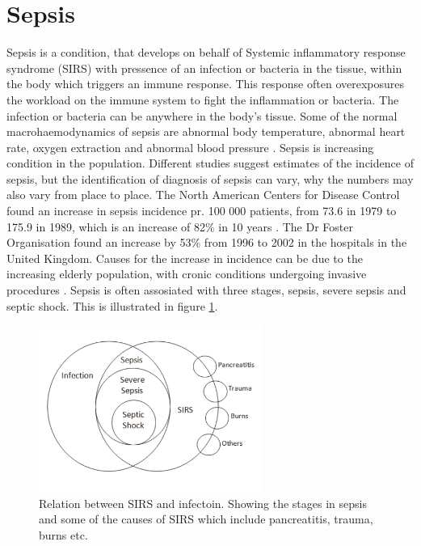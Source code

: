 \section{Sepsis}

Sepsis is a condition, that develops on behalf of Systemic inflammatory response syndrome (SIRS) with pressence of an infection or bacteria in the tissue, within the body which triggers an immune response. This response often overexposures the workload on the immune system to fight the inflammation or bacteria. The infection or bacteria can be anywhere in the body’s tissue. Some of the normal macrohaemodynamics of sepsis are abnormal body temperature, abnormal heart rate, oxygen extraction and abnormal blood pressure \cite{plunta2010,kanta2014}. Sepsis is increasing condition in the population. Different studies suggest estimates of the incidence of sepsis, but the identification of diagnosis of sepsis can vary, why the numbers may also vary from place to place. The North American Centers for Disease Control found an increase in sepsis incidence pr. 100 000 patients, from 73.6 in 1979 to 175.9 in 1989, which is an increase of 82\% in 10 years \cite{baudouin2008,kanta2014}. The Dr Foster Organisation found an increase by 53\% from 1996 to 2002 in the hospitals in the United Kingdom. Causes for the increase in incidence can be due to the increasing elderly population, with cronic conditions undergoing invasive procedures \cite{baudouin2008}.
Sepsis is often assosiated with three stages, sepsis, severe sepsis and septic shock. This is illustrated in figure \ref{fig:Sepsis_stages}.

\begin{figure}[H]
	\centering	\includegraphics[width=0.65\textwidth]{figures/Sepsis_stages}
	\caption{Relation between SIRS and infectoin. Showing the stages in sepsis and some of the causes of SIRS which include pancreatitis, trauma, burns etc.}
	\label{fig:Sepsis_stages}
\end{figure} \vspace{-.3cm}

